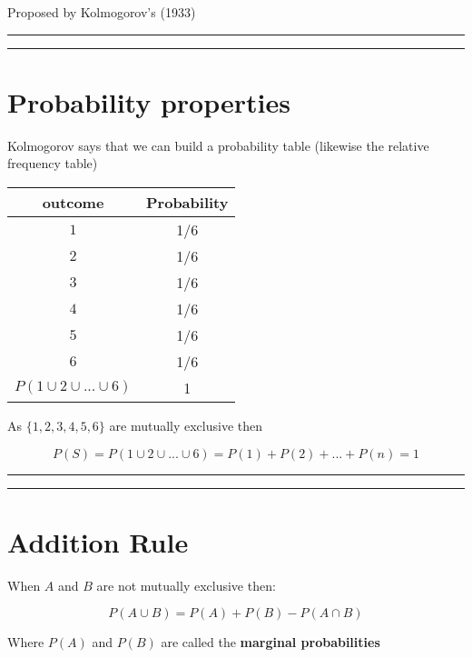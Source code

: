 \documentclass[
]{book}
\begin{document}
Proposed by Kolmogorov's (1933)

\begin{center}\rule{0.5\linewidth}{0.5pt}\end{center}

\begin{center}\rule{0.5\linewidth}{0.5pt}\end{center}

\hypertarget{probability-properties}{%
\section{Probability properties}\label{probability-properties}}

Kolmogorov says that we can build a probability table (likewise the relative frequency table)

\begin{longtable}[]{@{}cc@{}}
\toprule
outcome & Probability \\
\midrule
\endhead
\(1\) & 1/6 \\
\(2\) & 1/6 \\
\(3\) & 1/6 \\
\(4\) & 1/6 \\
\(5\) & 1/6 \\
\(6\) & 1/6 \\
\(P(1 \cup 2\cup ... \cup 6)\) & 1 \\
\bottomrule
\end{longtable}

As \(\{1,2,3,4,5,6\}\) are mutually exclusive then

\[P(S)=P(1\cup 2\cup ... \cup 6) = P(1)+P(2)+ ...+P(n)=1\]

\begin{center}\rule{0.5\linewidth}{0.5pt}\end{center}

\begin{center}\rule{0.5\linewidth}{0.5pt}\end{center}

\hypertarget{addition-rule}{%
\section{Addition Rule}\label{addition-rule}}

When \(A\) and \(B\) are not mutually exclusive then:

\[P(A \cup B)=P(A) + P(B) - P(A\cap B)\]

Where \(P(A)\) and \(P(B)\) are called the \textbf{marginal probabilities}
\end{document}
